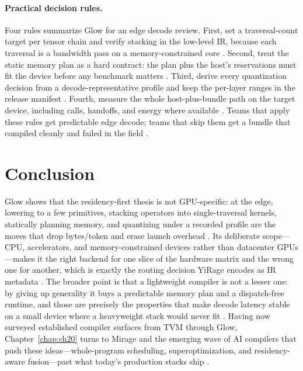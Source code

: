 \paragraph{Practical decision rules.}
Four rules summarize Glow for an edge decode review. First, set a traversal-count target per tensor chain and verify stacking in the low-level IR, because each traversal is a bandwidth pass on a memory-constrained core \citep{rotem2018glow,memoryfloor2026}. Second, treat the static memory plan as a hard contract: the plan plus the host's reservations must fit the device before any benchmark matters \citep{dlbook,amd2024aie}. Third, derive every quantization decision from a decode-representative profile and keep the per-layer ranges in the release manifest \citep{rotem2018glow,patel2025llminference}. Fourth, measure the whole host-plus-bundle path on the target device, including calls, handoffs, and energy where available \citep{taxbreak2026,patel2025llminference}. Teams that apply these rules get predictable edge decode; teams that skip them get a bundle that compiled cleanly and failed in the field \citep{memoryfloor2026,rotem2018glow}.

\section{Conclusion}
\label{sec:ch19_conclusion}

Glow shows that the residency-first thesis is not GPU-specific: at the edge, lowering to a few primitives, stacking operators into single-traversal kernels, statically planning memory, and quantizing under a recorded profile are the moves that drop bytes/token and erase launch overhead \citep{rotem2018glow,pytorchglow2024}. Its deliberate scope---CPU, accelerators, and memory-constrained devices rather than datacenter GPUs---makes it the right backend for one slice of the hardware matrix and the wrong one for another, which is exactly the routing decision YiRage encodes as IR metadata \citep{yirage2026,taxbreak2026}. The broader point is that a lightweight compiler is not a lesser one: by giving up generality it buys a predictable memory plan and a dispatch-free runtime, and those are precisely the properties that make decode latency stable on a small device where a heavyweight stack would never fit \citep{rotem2018glow,patel2025llminference}. Having now surveyed established compiler surfaces from TVM through Glow, Chapter~\ref{chap:ch20} turns to Mirage and the emerging wave of AI compilers that push these ideas---whole-program scheduling, superoptimization, and residency-aware fusion---past what today's production stacks ship \citep{memoryfloor2026,dlbook}.

